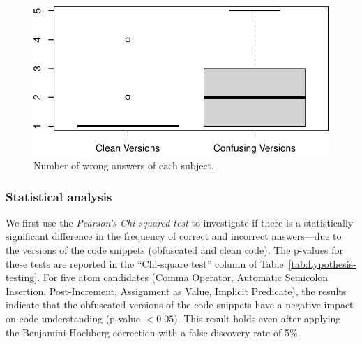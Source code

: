 \begin{figure}[b!]
\noindent
 \centering
 \includegraphics[width=0.6\columnwidth]{images/wrong-answers-plot-1.pdf}
 \caption{Number of wrong answers of each subject.}
 \label{fig:boxplotcorrectness}
 \end{figure}%
 

\subsubsection*{Statistical analysis}

We first use the \emph{Pearson's Chi-squared test}
to investigate if there is a statistically significant difference in the frequency of correct and incorrect answers---due to the versions of the code snippets (obfuscated and clean code). The p-values for these tests are reported in the ``Chi-square test'' column of Table~\ref{tab:hypothesis-testing}. For five atom candidates (Comma Operator, Automatic Semicolon Insertion, Post-Increment, Assignment as Value, Implicit Predicate), the results indicate that the obfuscated versions of the code snippets have a negative impact on code understanding (p-value $< 0.05$). This result holds even after applying the Benjamini-Hochberg correction with a false discovery rate of 5\%. 

